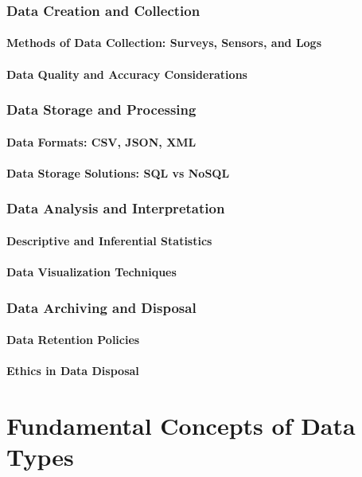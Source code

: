 \documentclass[12pt, oneside]{book}
\begin{document}
\subsection{Data Creation and Collection}
\subsubsection{Methods of Data Collection: Surveys, Sensors, and Logs}
\subsubsection{Data Quality and Accuracy Considerations}
\subsection{Data Storage and Processing}
\subsubsection{Data Formats: CSV, JSON, XML}
\subsubsection{Data Storage Solutions: SQL vs NoSQL}
\subsection{Data Analysis and Interpretation}
\subsubsection{Descriptive and Inferential Statistics}
\subsubsection{Data Visualization Techniques}
\subsection{Data Archiving and Disposal}
\subsubsection{Data Retention Policies}
\subsubsection{Ethics in Data Disposal}

\chapter{Fundamental Concepts of Data Types}
\end{document}
